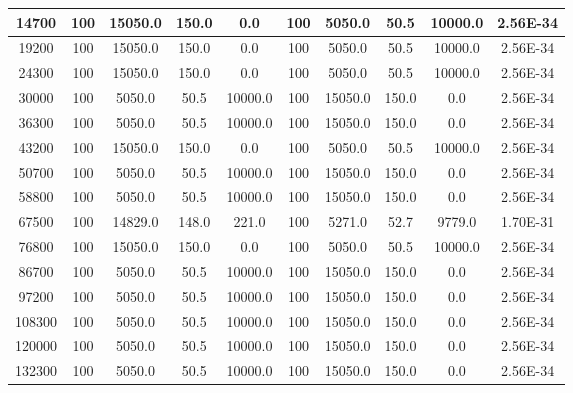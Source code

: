 \begin{tabular}{|c|c|c|c|c|c|c|c|c|c|}
14700 & 100 & 15050.0 & 150.0 & 0.0 & 100 & 5050.0 & 50.5 & 10000.0 & 2.56E-34\\ \hline
19200 & 100 & 15050.0 & 150.0 & 0.0 & 100 & 5050.0 & 50.5 & 10000.0 & 2.56E-34\\ \hline
24300 & 100 & 15050.0 & 150.0 & 0.0 & 100 & 5050.0 & 50.5 & 10000.0 & 2.56E-34\\ \hline
30000 & 100 & 5050.0 & 50.5 & 10000.0 & 100 & 15050.0 & 150.0 & 0.0 & 2.56E-34\\ \hline
36300 & 100 & 5050.0 & 50.5 & 10000.0 & 100 & 15050.0 & 150.0 & 0.0 & 2.56E-34\\ \hline
43200 & 100 & 15050.0 & 150.0 & 0.0 & 100 & 5050.0 & 50.5 & 10000.0 & 2.56E-34\\ \hline
50700 & 100 & 5050.0 & 50.5 & 10000.0 & 100 & 15050.0 & 150.0 & 0.0 & 2.56E-34\\ \hline
58800 & 100 & 5050.0 & 50.5 & 10000.0 & 100 & 15050.0 & 150.0 & 0.0 & 2.56E-34\\ \hline
67500 & 100 & 14829.0 & 148.0 & 221.0 & 100 & 5271.0 & 52.7 & 9779.0 & 1.70E-31\\ \hline
76800 & 100 & 15050.0 & 150.0 & 0.0 & 100 & 5050.0 & 50.5 & 10000.0 & 2.56E-34\\ \hline
86700 & 100 & 5050.0 & 50.5 & 10000.0 & 100 & 15050.0 & 150.0 & 0.0 & 2.56E-34\\ \hline
97200 & 100 & 5050.0 & 50.5 & 10000.0 & 100 & 15050.0 & 150.0 & 0.0 & 2.56E-34\\ \hline
108300 & 100 & 5050.0 & 50.5 & 10000.0 & 100 & 15050.0 & 150.0 & 0.0 & 2.56E-34\\ \hline
120000 & 100 & 5050.0 & 50.5 & 10000.0 & 100 & 15050.0 & 150.0 & 0.0 & 2.56E-34\\ \hline
132300 & 100 & 5050.0 & 50.5 & 10000.0 & 100 & 15050.0 & 150.0 & 0.0 & 2.56E-34\\ \hline
\end{tabular}